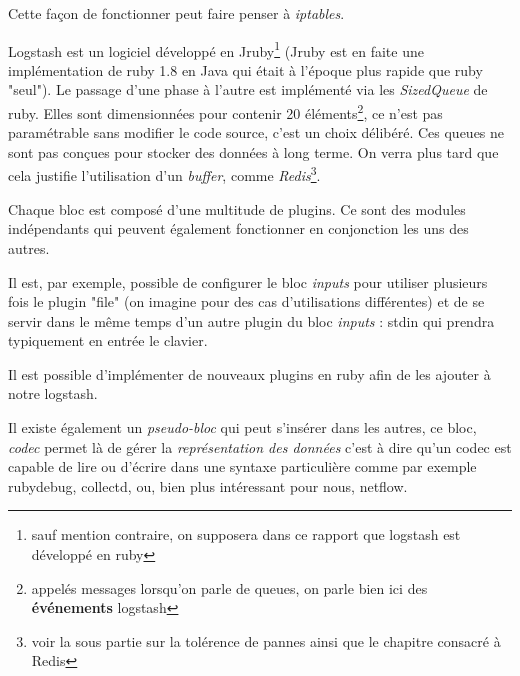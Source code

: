 Cette façon de fonctionner peut faire penser à \emph{iptables}.

Logstash est un logiciel développé en Jruby\footnote{sauf mention contraire, on supposera
dans ce rapport que logstash est développé en ruby} (Jruby est en faite une implémentation
de ruby 1.8 en Java qui était à l'époque plus rapide que ruby "seul"). 
Le passage d'une phase à l'autre est implémenté via les \emph{SizedQueue} de ruby. 
Elles sont dimensionnées pour contenir 20 éléments\footnote{appelés messages lorsqu'on parle de queues, on parle bien ici 
des \textbf{événements} logstash}, ce n'est pas paramétrable sans modifier le code 
source, c'est un choix délibéré. Ces queues ne sont pas conçues pour stocker des 
données à long terme. On verra plus tard que cela justifie l'utilisation d'un 
\textit{buffer}, comme \emph{Redis}\footnote{voir la sous partie sur la tolérence
de pannes ainsi que le chapitre consacré à Redis}.


Chaque bloc est composé d'une multitude de plugins. Ce sont des modules indépendants
qui peuvent également fonctionner en conjonction les uns des autres.

Il est, par exemple, possible de configurer le bloc \emph{inputs} pour utiliser 
plusieurs fois le plugin "file" (on imagine pour des cas d'utilisations différentes) 
et de se servir dans le même temps d'un autre plugin du bloc \emph{inputs} : stdin 
qui prendra typiquement en entrée le clavier.


Il est possible d'implémenter de nouveaux plugins en ruby afin de les ajouter à
notre logstash.

Il existe également un \textit{pseudo-bloc} qui peut s'insérer dans les autres, ce 
bloc, \emph{codec} permet là de gérer la \textit{représentation des données} c'est 
à dire qu'un codec est capable de lire ou d'écrire dans une syntaxe particulière 
comme par exemple rubydebug, collectd, ou, bien plus intéressant pour nous, netflow.




